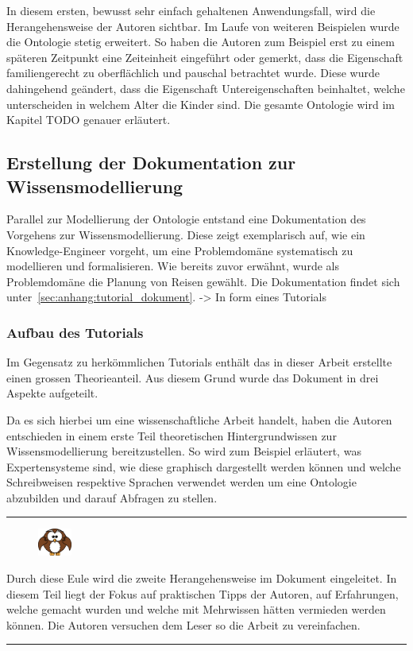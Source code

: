 In diesem ersten, bewusst sehr einfach gehaltenen Anwendungsfall, wird die Herangehensweise der Autoren sichtbar. Im Laufe von weiteren Beispielen wurde die Ontologie stetig erweitert. So haben die Autoren zum Beispiel erst zu einem späteren Zeitpunkt eine Zeiteinheit eingeführt oder gemerkt, dass die Eigenschaft familiengerecht zu oberflächlich und pauschal betrachtet wurde. Diese wurde dahingehend geändert, dass die Eigenschaft Untereigenschaften beinhaltet, welche unterscheiden in welchem Alter die Kinder sind. Die gesamte Ontologie wird im Kapitel {\color{red} TODO} genauer erläutert.

\subsection{Erstellung der Dokumentation zur Wissensmodellierung}
\label{subsec:dokumentation_wissensmodellierung}
Parallel zur Modellierung der Ontologie entstand eine Dokumentation des Vorgehens zur Wissensmodellierung. Diese zeigt exemplarisch auf, wie ein Knowledge-Engineer vorgeht, um eine Problemdomäne systematisch zu modellieren und formalisieren. Wie bereits zuvor erwähnt, wurde als Problemdomäne die Planung von Reisen gewählt. Die Dokumentation findet sich unter~\autoref{sec:anhang:tutorial_dokument}. -> In form eines Tutorials 

\subsubsection{Aufbau des Tutorials}
\label{subsec:dokumentation_wissensmodellierung_aufbau}
Im Gegensatz zu herkömmlichen Tutorials enthält das in dieser Arbeit erstellte einen grossen Theorieanteil. Aus diesem Grund wurde das Dokument in drei Aspekte aufgeteilt.

Da es sich hierbei um eine wissenschaftliche Arbeit handelt, haben die Autoren entschieden in einem erste Teil theoretischen Hintergrundwissen zur Wissensmodellierung bereitzustellen. So wird zum Beispiel erläutert, was Expertensysteme sind, wie diese graphisch dargestellt werden können und welche Schreibweisen respektive Sprachen verwendet werden um eine Ontologie abzubilden und darauf Abfragen zu stellen.

\noindent\rule[1ex]{\textwidth}{1pt}
\begin{figure}
    \vspace{-18pt}
    \includegraphics[width=0.1\textwidth]{bilder/owl.png}
\end{figure}
Durch diese Eule wird die zweite Herangehensweise im Dokument eingeleitet. In diesem Teil liegt der Fokus auf praktischen Tipps der Autoren, auf Erfahrungen, welche gemacht wurden und welche mit Mehrwissen hätten vermieden werden können. Die Autoren versuchen dem Leser so die Arbeit zu vereinfachen.\\
\noindent\rule[1ex]{\textwidth}{1pt}


